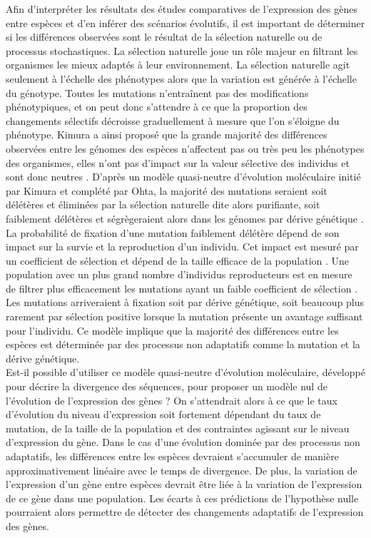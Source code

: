 Afin d’interpréter les résultats des études comparatives de l’expression des gènes entre espèces et d’en inférer des scénarios évolutifs, il est important de déterminer si les différences observées sont le résultat de la sélection naturelle ou de processus stochastiques. La sélection naturelle joue un rôle majeur en filtrant les organismes les mieux adaptés à leur environnement. La sélection naturelle agit seulement à l’échelle des phénotypes alors que la variation est générée à l’échelle du génotype. Toutes les mutations n'entraînent pas des modifications phénotypiques, et on peut donc s’attendre à ce que la proportion des changements sélectifs décroisse graduellement à mesure que l’on s’éloigne du phénotype. Kimura a ainsi proposé que la grande majorité des différences observées entre les génomes des espèces n’affectent pas ou très peu les phénotypes des organismes, elles n’ont pas d’impact sur la valeur sélective des individus et sont donc neutres \citep{kimura_neutral_1983}. D’après un modèle quasi-neutre d’évolution moléculaire initié par Kimura et complété par Ohta, la majorité des mutations seraient soit délétères et éliminées par la sélection naturelle dite alors purifiante, soit faiblement délétères et ségrègeraient alors dans les génomes par dérive génétique \citep{ohta_synonymous_1995}. La probabilité de fixation d’une mutation faiblement délétère dépend de son impact sur la survie et la reproduction d’un individu. Cet impact est mesuré par un coefficient de sélection et dépend de la taille efficace de la population \citep{charlesworth_effective_2009}. Une population avec un plus grand nombre d’individus reproducteurs est en mesure de filtrer plus efficacement les mutations ayant un faible coefficient de sélection \citep{ohta_slightly_1973}. Les mutations arriveraient à fixation soit par dérive génétique, soit beaucoup plus rarement par sélection positive lorsque la mutation présente un avantage suffisant pour l’individu. Ce modèle implique que la majorité des différences entre les espèces est déterminée par des processus non adaptatifs comme la mutation et la dérive génétique. \\

Est-il possible d’utiliser ce modèle quasi-neutre d’évolution moléculaire, développé pour décrire la divergence des séquences, pour proposer un modèle nul de l'évolution de l’expression des gènes ? On s'attendrait alors à ce que le taux d’évolution du niveau d’expression soit fortement dépendant du taux de mutation, de la taille de la population et des contraintes agissant sur le niveau d’expression du gène. Dans le cas d’une évolution dominée par des processus non adaptatifs, les différences entre les espèces devraient s’accumuler de manière approximativement linéaire avec le temps de divergence. De plus, la variation de l’expression d’un gène entre espèces devrait être liée à la variation de l’expression de ce gène dans une population. Les écarts à ces prédictions de l’hypothèse nulle pourraient alors permettre de détecter des changements adaptatifs de l’expression des gènes.\\

